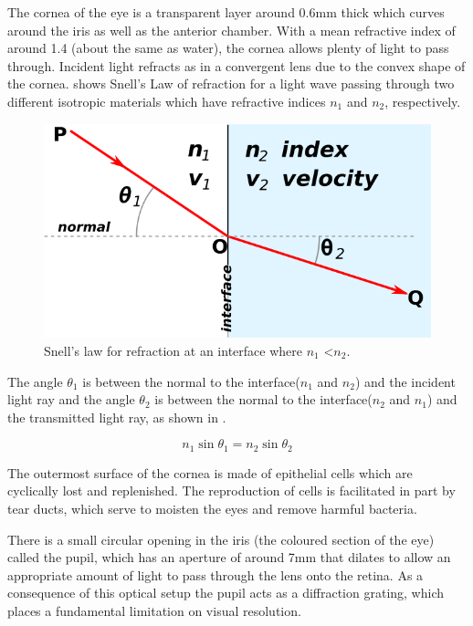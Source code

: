 The cornea of the eye is a transparent layer around 0.6mm thick
which curves around the iris as well as the anterior
chamber.\cite{yaylali1997corneal,thoft1983x,patel1994refractive}
With a mean refractive index of around 1.4 (about the same as water),
the cornea allows plenty of light to pass through. Incident light refracts
as in a convergent lens due to the convex shape of the cornea. 
 shows Snell's Law of refraction for a light wave
passing through two different isotropic materials which have refractive
indices $n_1$ and $n_2$, respectively.

\begin{figure}[htbp]
\centering
  \includegraphics{figures/snells}
\caption{Snell's law for refraction at an interface where
             $n_1$ \textless $n_2$.\cite{wikisnell}}
\label{fig:snell}
\end{figure}

The angle $\theta_1$ is between the normal to the interface($n_1$ and $n_2$)
and the incident light ray and the angle $\theta_2$ is between the normal to
the interface($n_2$ and $n_1$) and the transmitted light ray, as shown in
.

\begin{equation}
n_1\sin\theta_1=n_2\sin\theta_2
\label{eq:refractive}
\end{equation}

The outermost surface of the cornea is made of epithelial cells which
are cyclically lost and replenished.
\cite{jester1999cellular,hassell2010molecular} The reproduction
of cells is facilitated in part by tear ducts, which serve to
moisten the eyes and remove harmful bacteria.\cite{holly1977tear}

There is a small circular opening in the iris (the coloured section of
the eye) called the pupil, which has an aperture of around 7mm that
dilates to allow an appropriate amount of light to pass through
the lens onto the retina.\cite{krugman1964some} As a consequence of
this optical setup the pupil acts as a diffraction grating, which places a 
fundamental limitation on visual resolution. 

